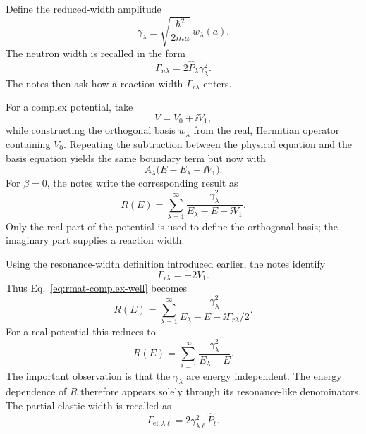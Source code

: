 Define the reduced-width amplitude
\begin{equation}
  \gamma_\lambda
  \equiv
  \sqrt{\frac{\hbar^2}{2ma}}\,w_\lambda(a).
  \label{eq:rmat-reduced-width}
\end{equation}
The neutron width is recalled in the form
\[
  \Gamma_{n\lambda}=2\widehat P_\lambda\gamma_\lambda^2.
\]
The notes then ask how a reaction width $\Gamma_{r\lambda}$ enters.

For a complex potential, take
\[
  V=V_0+\ii V_1,
\]
while constructing the orthogonal basis $w_\lambda$ from the real, Hermitian operator containing $V_0$.  Repeating the subtraction between the physical equation and the basis equation yields the same boundary term but now with
\[
  A_\lambda\bigl(E-E_\lambda-\ii V_1\bigr).
\]
For $\beta=0$, the notes write the corresponding result as
\begin{equation}
  R(E)=\sum_{\lambda=1}^{\infty}
  \frac{\gamma_\lambda^2}{E_\lambda-E+\ii V_1}.
  \label{eq:rmat-complex-well}
\end{equation}
Only the real part of the potential is used to define the orthogonal basis; the imaginary part supplies a reaction width.

Using the resonance-width definition introduced earlier, the notes identify
\[
  \Gamma_{r\lambda}=-2V_1.
\]
Thus Eq.~\eqref{eq:rmat-complex-well} becomes
\begin{equation}
  \boxed{
  R(E)=\sum_{\lambda=1}^{\infty}
  \frac{\gamma_\lambda^2}
  {E_\lambda-E-\ii\Gamma_{r\lambda}/2}.}
  \label{eq:rmat-reaction-width}
\end{equation}
For a real potential this reduces to
\begin{equation}
  R(E)=\sum_{\lambda=1}^{\infty}
  \frac{\gamma_\lambda^2}{E_\lambda-E}.
  \label{eq:rmat-real-pole-form}
\end{equation}
The important observation is that the $\gamma_\lambda$ are energy independent.  The energy dependence of $R$ therefore appears solely through its resonance-like denominators.  The partial elastic width is recalled as
\[
  \Gamma_{\mathrm{el},\lambda\ell}
  =2\gamma_{\lambda\ell}^{2}\widehat P_\ell.
\]

